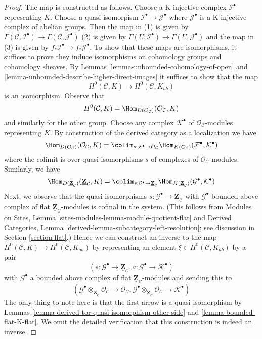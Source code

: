\begin{proof}
The map is constructed as follows. Choose a K-injective complex
$\mathcal{I}^\bullet$ representing $K$. Choose a quasi-isomorpism
$\mathcal{I}^\bullet \to \mathcal{J}^\bullet$ where $\mathcal{J}^\bullet$
is a K-injective complex of abelian groups. Then the map in
(1) is given by
$\Gamma(\mathcal{C}, \mathcal{I}^\bullet) \to
\Gamma(\mathcal{C}, \mathcal{J}^\bullet)$
(2) is given by
$\Gamma(U, \mathcal{I}^\bullet) \to \Gamma(U, \mathcal{J}^\bullet)$
and the map in (3) is given by
$f_*\mathcal{I}^\bullet \to f_*\mathcal{J}^\bullet$.
To show that these maps are isomorphisms, it suffices to prove
they induce isomorphisms on cohomology groups and cohomology sheaves.
By Lemmas \ref{lemma-unbounded-cohomology-of-open} and
\ref{lemma-unbounded-describe-higher-direct-images}
it suffices to show that the map
$$
H^0(\mathcal{C}, K) \longrightarrow H^0(\mathcal{C}, K_{ab})
$$
is an isomorphism. Observe that
$$
H^0(\mathcal{C}, K) =
\Hom_{D(\mathcal{O}_\mathcal{C})}(\mathcal{O}_\mathcal{C}, K)
$$
and similarly for the other group. Choose any complex $\mathcal{K}^\bullet$
of $\mathcal{O}_\mathcal{C}$-modules representing $K$. By construction of the
derived category as a localization we have
$$
\Hom_{D(\mathcal{O}_\mathcal{C})}(\mathcal{O}_\mathcal{C}, K) =
\colim_{s : \mathcal{F}^\bullet \to \mathcal{O}_\mathcal{C}}
\Hom_{K(\mathcal{O}_\mathcal{C})}(\mathcal{F}^\bullet, \mathcal{K}^\bullet)
$$
where the colimit is over quasi-isomorphisms $s$ of complexes of
$\mathcal{O}_\mathcal{C}$-modules. Similarly, we have
$$
\Hom_{D(\underline{\mathbf{Z}}_\mathcal{C})}
(\underline{\mathbf{Z}}_\mathcal{C}, K) =
\colim_{s : \mathcal{G}^\bullet \to \underline{\mathbf{Z}}_\mathcal{C}}
\Hom_{K(\underline{\mathbf{Z}}_\mathcal{C})}
(\mathcal{G}^\bullet, \mathcal{K}^\bullet)
$$
Next, we observe that the quasi-isomorphisms
$s : \mathcal{G}^\bullet \to \underline{\mathbf{Z}}_\mathcal{C}$
with $\mathcal{G}^\bullet$ bounded above complex of flat
$\underline{\mathbf{Z}}_\mathcal{C}$-modules is cofinal in the system.
(This follows from Modules on Sites, Lemma
\ref{sites-modules-lemma-module-quotient-flat} and
Derived Categories, Lemma \ref{derived-lemma-subcategory-left-resolution};
see discussion in Section \ref{section-flat}.)
Hence we can construct an inverse to the map
$H^0(\mathcal{C}, K) \longrightarrow H^0(\mathcal{C}, K_{ab})$
by representing an element $\xi \in H^0(\mathcal{C}, K_{ab})$ by a pair
$$
(s : \mathcal{G}^\bullet \to \underline{\mathbf{Z}}_\mathcal{C},
a : \mathcal{G}^\bullet \to \mathcal{K}^\bullet)
$$
with $\mathcal{G}^\bullet$ a bounded above complex of flat
$\underline{\mathbf{Z}}_\mathcal{C}$-modules and sending this to
$$
(\mathcal{G}^\bullet \otimes_{\underline{\mathbf{Z}}_\mathcal{C}}
\mathcal{O}_\mathcal{C}
\to \mathcal{O}_\mathcal{C},
\mathcal{G}^\bullet  \otimes_{\underline{\mathbf{Z}}_\mathcal{C}}
\mathcal{O}_\mathcal{C}
\to \mathcal{K}^\bullet)
$$
The only thing to note here is that the first arrow
is a quasi-isomorphism by
Lemmas \ref{lemma-derived-tor-quasi-isomorphism-other-side} and
\ref{lemma-bounded-flat-K-flat}.
We omit the detailed verification that this construction
is indeed an inverse.
\end{proof}

